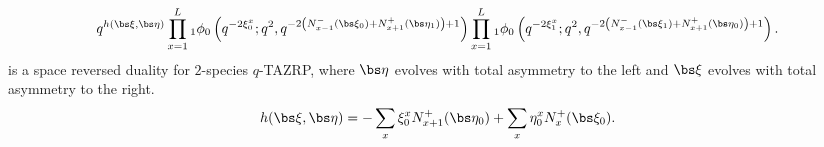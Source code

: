 \begin{theorem}
\begin{equation}
   q^{h(\bs\xi,\bs\eta)} \prod_{x=1}^L{}_1\phi_0\left(q^{-2\xi_0^x};q^2,q^{-2\left(N_{x-1}^-(\bs\xi_0)+N_{x+1}^+(\bs\eta_1)\right)+1}\right)
    \prod_{x=1}^L{}_1\phi_0\left(q^{-2\xi_1^x};q^2,q^{-2\left(N_{x-1}^-(\bs\xi_1)+N_{x+1}^+(\bs\eta_0)\right)+1}\right).
\end{equation}
is a space reversed duality for $2$-species $q$-TAZRP, where $\bs\eta$ evolves with total asymmetry to the left and $\bs\xi$ evolves with total asymmetry to the right. 
\begin{equation}
  h(\bs\xi,\bs\eta)%
  = -\sum_x\xi_0^xN_{x+1}^+(\bs\eta_0)+\sum_x\eta_0^xN_{x}^+(\bs\xi_0).
\end{equation}
\end{theorem}


